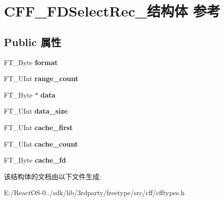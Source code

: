 \hypertarget{struct_c_f_f___f_d_select_rec__}{}\section{C\+F\+F\+\_\+\+F\+D\+Select\+Rec\+\_\+结构体 参考}
\label{struct_c_f_f___f_d_select_rec__}
\subsection*{Public 属性}
\begin{DoxyCompactItemize}
\item 
\mbox{\label{struct_c_f_f___f_d_select_rec___a8b5da79a2b66bb2ea860cf9800733d23}} 
F\+T\+\_\+\+Byte {\bfseries format}
\item 
\mbox{\label{struct_c_f_f___f_d_select_rec___a8e4e7b73656c20070ddd16e9d2c099c9}} 
F\+T\+\_\+\+U\+Int {\bfseries range\+\_\+count}
\item 
\mbox{\label{struct_c_f_f___f_d_select_rec___a84397824b8357719949f3ecfac81dbaf}} 
F\+T\+\_\+\+Byte $\ast$ {\bfseries data}
\item 
\mbox{\label{struct_c_f_f___f_d_select_rec___aa7005aad0eb73b0f1b9e23b9ba8aa131}} 
F\+T\+\_\+\+U\+Int {\bfseries data\+\_\+size}
\item 
\mbox{\label{struct_c_f_f___f_d_select_rec___a1dc4bad23f1e0816758fec5ef32c7f7a}} 
F\+T\+\_\+\+U\+Int {\bfseries cache\+\_\+first}
\item 
\mbox{\label{struct_c_f_f___f_d_select_rec___a389b2283045023029ec55463fde85cfa}} 
F\+T\+\_\+\+U\+Int {\bfseries cache\+\_\+count}
\item 
\mbox{\label{struct_c_f_f___f_d_select_rec___a34ac19750608f460047f0b9161fc8ff7}} 
F\+T\+\_\+\+Byte {\bfseries cache\+\_\+fd}
\end{DoxyCompactItemize}


该结构体的文档由以下文件生成\+:\begin{DoxyCompactItemize}
\item 
E\+:/\+React\+O\+S-\/0../sdk/lib/3rdparty/freetype/src/cff/cfftypes.\+h\end{DoxyCompactItemize}
